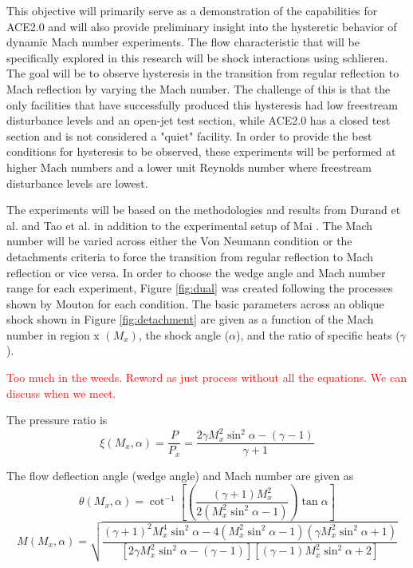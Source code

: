 This objective will primarily serve as a demonstration of the capabilities for ACE2.0 and will also provide preliminary insight into the hysteretic behavior of dynamic Mach number experiments. The flow characteristic that will be specifically explored in this research will be shock interactions using schlieren. The goal will be to observe hysteresis in the transition from regular reflection to Mach reflection by varying the Mach number. The challenge of this is that the only facilities that have successfully produced this hysteresis had low freestream disturbance levels and an open-jet test section, while ACE2.0 has a closed test section and is not considered a "quiet" facility. In order to provide the best conditions for hysteresis to be observed, these experiments will be performed at higher Mach numbers and a lower unit Reynolds number where freestream disturbance levels are lowest.

The experiments will be based on the methodologies and results from Durand et al. \cite{durand} and Tao et al. \cite{tao} in addition to the experimental setup of Mai \cite{mai-dis}. The Mach number will be varied across either the Von Neumann condition or the detachments criteria to force the transition from regular reflection to Mach reflection or vice versa. In order to choose the wedge angle and Mach number range for each experiment, Figure \ref{fig:dual} was created following the processes shown by Mouton \cite{mouton} for each condition. The basic parameters across an oblique shock shown in Figure \ref{fig:detachment} are given as a function of the Mach number in region x $\left(M_x\right)$, the shock angle ($\alpha$), and the ratio of specific heats ($\gamma$). 

\textcolor{red}{Too much in the weeds. Reword as just process without all the equations. We can discuss when we meet.}

The pressure ratio is 
\begin{equation}
    \xi \left(M_x,\alpha\right) = \frac{P}{P_x} = \frac{2 \gamma M_x^2 \sin^2{\alpha} - (\gamma-1)}{\gamma+1}
\end{equation}

\noindent The flow deflection angle (wedge angle) and Mach number are given as
\begin{equation}
    \theta \left(M_x,\alpha\right) = \cot^{-1}{\left[ \left(\frac{(\gamma+1) M_x^2}{2\left(M_x^2 \sin^2{\alpha} - 1\right)}\right) \tan{\alpha} \right]}
\end{equation}
\begin{equation}
    M \left(M_x,\alpha\right) = \sqrt{\frac{(\gamma+1)^2 M_x^4 \sin^2{\alpha} - 4\left(M_x^2 \sin^2{\alpha} - 1\right)\left(\gamma M_x^2 \sin^2{\alpha} + 1\right)}{\left[2 \gamma M_x^2 \sin^2{\alpha} - (\gamma-1)\right]\left[(\gamma-1) M_x^2 \sin^2{\alpha} + 2\right]}}
\end{equation}

